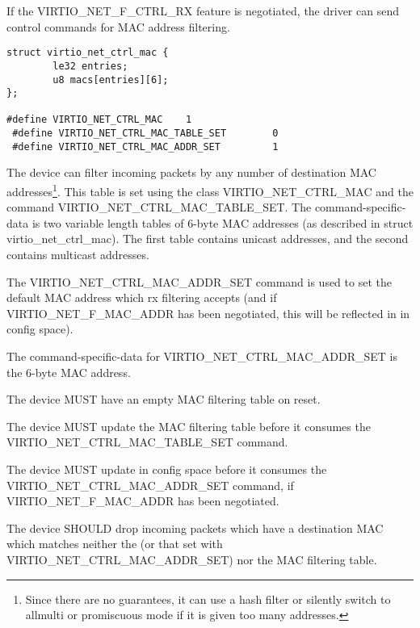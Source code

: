 If the VIRTIO_NET_F_CTRL_RX feature is negotiated, the driver can
send control commands for MAC address filtering.

\begin{lstlisting}
struct virtio_net_ctrl_mac {
        le32 entries;
        u8 macs[entries][6];
};

#define VIRTIO_NET_CTRL_MAC    1
 #define VIRTIO_NET_CTRL_MAC_TABLE_SET        0
 #define VIRTIO_NET_CTRL_MAC_ADDR_SET         1
\end{lstlisting}

The device can filter incoming packets by any number of destination
MAC addresses\footnote{Since there are no guarantees, it can use a hash filter or
silently switch to allmulti or promiscuous mode if it is given too
many addresses.
}. This table is set using the class
VIRTIO_NET_CTRL_MAC and the command VIRTIO_NET_CTRL_MAC_TABLE_SET. The
command-specific-data is two variable length tables of 6-byte MAC
addresses (as described in struct virtio_net_ctrl_mac). The first table contains unicast addresses, and the second
contains multicast addresses.

The VIRTIO_NET_CTRL_MAC_ADDR_SET command is used to set the
default MAC address which rx filtering
accepts (and if VIRTIO_NET_F_MAC_ADDR has been negotiated,
this will be reflected in  in config space).

The command-specific-data for VIRTIO_NET_CTRL_MAC_ADDR_SET is
the 6-byte MAC address.


The device MUST have an empty MAC filtering table on reset.

The device MUST update the MAC filtering table before it consumes
the VIRTIO_NET_CTRL_MAC_TABLE_SET command.

The device MUST update  in config space before it consumes
the VIRTIO_NET_CTRL_MAC_ADDR_SET command, if VIRTIO_NET_F_MAC_ADDR has
been negotiated.

The device SHOULD drop incoming packets which have a destination MAC which
matches neither the  (or that set with VIRTIO_NET_CTRL_MAC_ADDR_SET)
nor the MAC filtering table.


